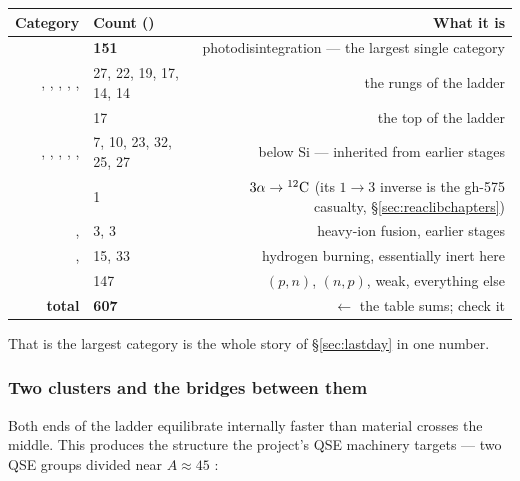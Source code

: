 \begin{center}
\small
\begin{tabularx}{\textwidth}{@{}R{0.955} l R{1.045}@{}}
\toprule
\textbf{Category} & \textbf{Count ()} & \textbf{What it is} \\
\midrule
{} & \textbf{151} &
  photodisintegration --- the largest single category \\
, , , ,
,  & 27, 22, 19, 17, 14, 14 &
  the rungs of the ladder \\
 & 17 & the top of the ladder \\
, , , ,
,  & 7, 10, 23, 32, 25, 27 &
  below Si --- inherited from earlier stages \\
 & 1 &
  $3\alpha \to \nuc{C}{12}$ (its $1\to3$ inverse is the gh-575 casualty,
  \S\ref{sec:reaclibchapters}) \\
,  & 3, 3 &
  heavy-ion fusion, earlier stages \\
,  & 15, 33 &
  hydrogen burning, essentially inert here \\
 & 147 & $(p,n)$, $(n,p)$, weak, everything else \\
\midrule
\textbf{total} & \textbf{607} & $\leftarrow$ the table sums; check it \\
\bottomrule
\end{tabularx}
\end{center}

That  is the largest category is the whole story of
\S\ref{sec:lastday} in one number.

\subsubsection{Two clusters and the bridges between them}
\label{sec:clusters}

Both ends of the ladder equilibrate internally faster than material crosses the
middle. This produces the structure the project's QSE machinery targets --- two
QSE groups divided near $A \approx 45$ \citep{wac1973,hix1996}:

